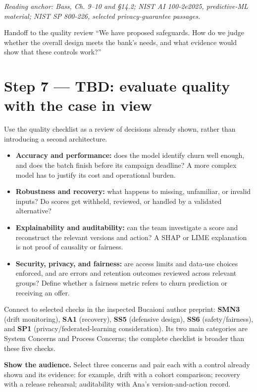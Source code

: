 \documentclass[12pt,a4paper]{article}
\newcommand{\source}[1]{\par\textcolor{teal!70!black}{\textit{Reading anchor: #1}}\par}
\begin{document}
\source{Bass, Ch. 9--10 and \S14.2; NIST AI 100-2e2025, predictive-ML material; NIST SP 800-226, selected privacy-guarantee passages.}

\begin{handoffbox}{Handoff to the quality review}
``We have proposed safeguards. How do we judge whether the overall design meets the bank's needs, and what evidence would show that these controls work?''
\end{handoffbox}

\section{Step 7 --- TBD: evaluate quality with the case in view}
Use the quality checklist as a review of decisions already shown, rather than introducing a second architecture.

\begin{itemize}
\item \textbf{Accuracy and performance:} does the model identify churn well enough, and does the batch finish before its campaign deadline? A more complex model has to justify its cost and operational burden.
\item \textbf{Robustness and recovery:} what happens to missing, unfamiliar, or invalid inputs? Do scores get withheld, reviewed, or handled by a validated alternative?
\item \textbf{Explainability and auditability:} can the team investigate a score and reconstruct the relevant versions and action? A SHAP or LIME explanation is not proof of causality or fairness.
\item \textbf{Security, privacy, and fairness:} are access limits and data-use choices enforced, and are errors and retention outcomes reviewed across relevant groups? Define whether a fairness metric refers to churn prediction or receiving an offer.
\end{itemize}

Connect to selected checks in the inspected Bucaioni author preprint: \textbf{SMN3} (drift monitoring), \textbf{SA1} (recovery), \textbf{SS5} (defensive design), \textbf{SS6} (safety/fairness), and \textbf{SP1} (privacy/federated-learning consideration). Its two main categories are System Concerns and Process Concerns; the complete checklist is broader than these five checks.

\textbf{Show the audience.} Select three concerns and pair each with a control already shown and its evidence: for example, drift with a cohort comparison; recovery with a release rehearsal; auditability with Ana's version-and-action record.
\end{document}
